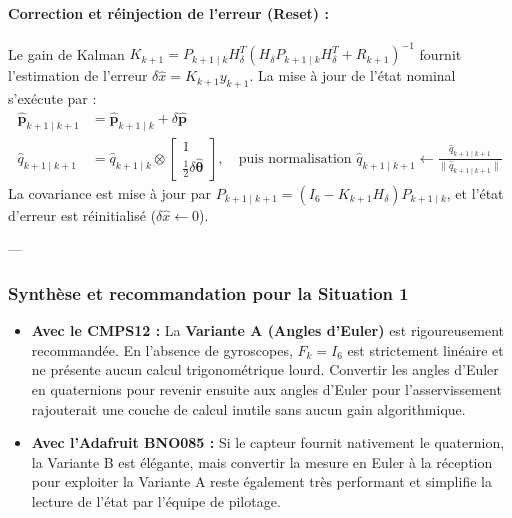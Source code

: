 \documentclass[../Formulations_Kalman.tex]{subfiles}
\begin{document}
\paragraph{Correction et réinjection de l'erreur (Reset) :}
Le gain de Kalman $K_{k+1} = P_{k+1\mid k} H_\delta^T (H_\delta P_{k+1\mid k} H_\delta^T + R_{k+1})^{-1}$ fournit l'estimation de l'erreur $\delta\hat{x} = K_{k+1} y_{k+1}$.
La mise à jour de l'état nominal s'exécute par :
\begin{align}
\hat{\mathbf{p}}_{k+1\mid k+1} &= \hat{\mathbf{p}}_{k+1\mid k} + \delta\hat{\mathbf{p}} \\
\hat{q}_{k+1\mid k+1} &= \hat{q}_{k+1\mid k} \otimes \begin{bmatrix} 1 \\ \frac{1}{2}\delta\hat{\boldsymbol{\theta}} \end{bmatrix}, \quad \text{puis normalisation } \hat{q}_{k+1\mid k+1} \leftarrow \frac{\hat{q}_{k+1\mid k+1}}{\|\hat{q}_{k+1\mid k+1}\|}
\end{align}
La covariance est mise à jour par $P_{k+1\mid k+1} = (I_6 - K_{k+1} H_\delta) P_{k+1\mid k}$, et l'état d'erreur est réinitialisé ($\delta\hat{x} \leftarrow 0$).

---

\subsubsection{Synthèse et recommandation pour la Situation 1}
\begin{itemize}
    \item \textbf{Avec le CMPS12 :} La \textbf{Variante A (Angles d'Euler)} est rigoureusement recommandée. En l'absence de gyroscopes, $F_k = I_6$ est strictement linéaire et ne présente aucun calcul trigonométrique lourd. Convertir les angles d'Euler en quaternions pour revenir ensuite aux angles d'Euler pour l'asservissement rajouterait une couche de calcul inutile sans aucun gain algorithmique.
    \item \textbf{Avec l'Adafruit BNO085 :} Si le capteur fournit nativement le quaternion, la Variante B est élégante, mais convertir la mesure en Euler à la réception pour exploiter la Variante A reste également très performant et simplifie la lecture de l'état par l'équipe de pilotage.
\end{itemize}
\end{document}
